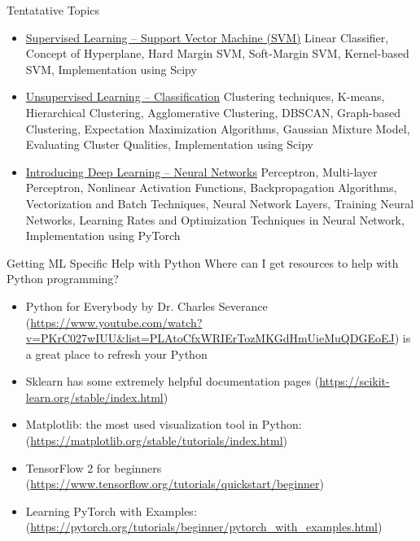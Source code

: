 \documentclass[aspectratio=169,xcolor=dvipsnames,svgnames,x11names,fleqn]{beamer}
\begin{document}
\begin{frame}{Tentatative Topics}
\begin{itemize}
    \item   \color{DarkRed}  \underline{Supervised Learning -- Support Vector Machine (SVM)} Linear Classifier, Concept of Hyperplane, Hard Margin SVM, Soft-Margin SVM, Kernel-based SVM, Implementation using Scipy
      
   

     \item  \color{DarkRed} \underline{Unsupervised Learning -- Classification} Clustering techniques, K-means, Hierarchical Clustering, Agglomerative Clustering, DBSCAN, Graph-based Clustering, Expectation Maximization Algorithms, Gaussian Mixture Model, Evaluating Cluster Qualities, Implementation using Scipy

      \item  \color{DarkRed} \underline{Introducing Deep Learning -- Neural Networks} Perceptron, Multi-layer Perceptron, Nonlinear Activation Functions, Backpropagation Algorithms, Vectorization and Batch Techniques, Neural Network Layers, Training Neural Networks, Learning Rates and Optimization Techniques in Neural Network, Implementation using PyTorch
    
   
\end{itemize}
\end{frame}

\begin{frame}{Getting ML Specific Help with Python}
Where can I get resources to help with Python programming?
\begin{itemize}
    \item Python for Everybody by Dr. Charles Severance ({\color{MediumRed}\url{https://www.youtube.com/watch?v=PKrC027wIUU&list=PLAtoCfxWRIErTozMKGdHmUieMuQDGEoEJ}}) is a great place to refresh your Python
    \item Sklearn has some extremely helpful documentation pages ({\color{MediumRed}\url{https://scikit-learn.org/stable/index.html}})
    \item Matplotlib: the most used visualization tool in Python: ({\color{MediumRed}\url{https://matplotlib.org/stable/tutorials/index.html}})
    \item TensorFlow 2 for beginners
    ({\color{MediumRed}\url{https://www.tensorflow.org/tutorials/quickstart/beginner}})

    \item Learning PyTorch with Examples: 
    ({\color{MediumRed}\url{https://pytorch.org/tutorials/beginner/pytorch_with_examples.html}})
\end{itemize} 


\end{frame}
\end{document}
